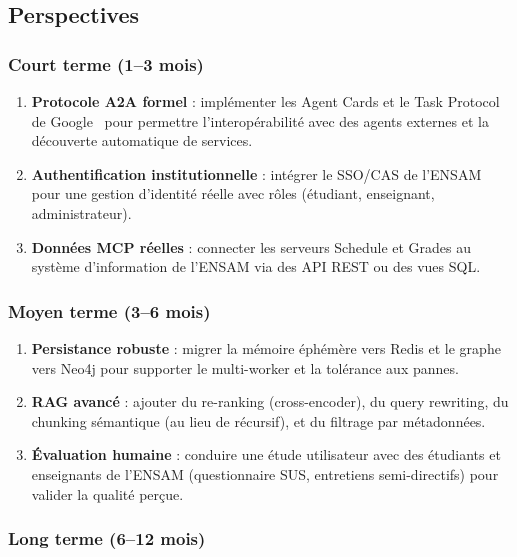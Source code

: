 \documentclass[12pt, a4paper]{article}
\begin{document}
\subsection{Perspectives}

\subsubsection{Court terme (1--3 mois)}

\begin{enumerate}
  \item \textbf{Protocole A2A formel} : implémenter les Agent Cards et le Task Protocol de Google~\cite{google2025a2a} pour permettre l'interopérabilité avec des agents externes et la découverte automatique de services.
  \item \textbf{Authentification institutionnelle} : intégrer le SSO/CAS de l'ENSAM pour une gestion d'identité réelle avec rôles (étudiant, enseignant, administrateur).
  \item \textbf{Données MCP réelles} : connecter les serveurs Schedule et Grades au système d'information de l'ENSAM via des API REST ou des vues SQL.
\end{enumerate}

\subsubsection{Moyen terme (3--6 mois)}

\begin{enumerate}
  \item \textbf{Persistance robuste} : migrer la mémoire éphémère vers Redis et le graphe vers Neo4j pour supporter le multi-worker et la tolérance aux pannes.
  \item \textbf{RAG avancé} : ajouter du re-ranking (cross-encoder), du query rewriting, du chunking sémantique (au lieu de récursif), et du filtrage par métadonnées.
  \item \textbf{Évaluation humaine} : conduire une étude utilisateur avec des étudiants et enseignants de l'ENSAM (questionnaire SUS, entretiens semi-directifs) pour valider la qualité perçue.
\end{enumerate}

\subsubsection{Long terme (6--12 mois)}
\end{document}

